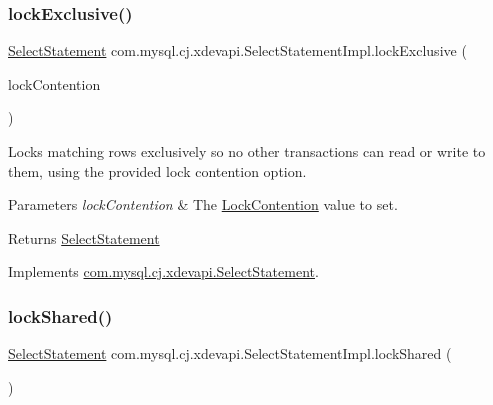 \subsubsection{\texorpdfstring{lock\+Exclusive()}{lockExclusive()}\hspace{0.1cm}{\footnotesize\ttfamily [2/2]}}
{\footnotesize\ttfamily \mbox{\hyperlink{interfacecom_1_1mysql_1_1cj_1_1xdevapi_1_1_select_statement}{Select\+Statement}} com.\+mysql.\+cj.\+xdevapi.\+Select\+Statement\+Impl.\+lock\+Exclusive (\begin{DoxyParamCaption}\item[{Lock\+Contention}]{lock\+Contention }\end{DoxyParamCaption})}

Locks matching rows exclusively so no other transactions can read or write to them, using the provided lock contention option.


\begin{DoxyParams}{Parameters}
{\em lock\+Contention} & The \mbox{\hyperlink{}{Lock\+Contention}} value to set. \\
\hline
\end{DoxyParams}
\begin{DoxyReturn}{Returns}
\mbox{\hyperlink{interfacecom_1_1mysql_1_1cj_1_1xdevapi_1_1_select_statement}{Select\+Statement}} 
\end{DoxyReturn}


Implements \mbox{\hyperlink{interfacecom_1_1mysql_1_1cj_1_1xdevapi_1_1_select_statement_a993dc3e6fa92a41a1ce2cb1aff9e7c4a}{com.\+mysql.\+cj.\+xdevapi.\+Select\+Statement}}.

\mbox{\label{classcom_1_1mysql_1_1cj_1_1xdevapi_1_1_select_statement_impl_a4c2746728bcf0ed59e1604d57f94f8b2}} 
\subsubsection{\texorpdfstring{lock\+Shared()}{lockShared()}\hspace{0.1cm}{\footnotesize\ttfamily [1/2]}}
{\footnotesize\ttfamily \mbox{\hyperlink{interfacecom_1_1mysql_1_1cj_1_1xdevapi_1_1_select_statement}{Select\+Statement}} com.\+mysql.\+cj.\+xdevapi.\+Select\+Statement\+Impl.\+lock\+Shared (\begin{DoxyParamCaption}{ }\end{DoxyParamCaption})}

